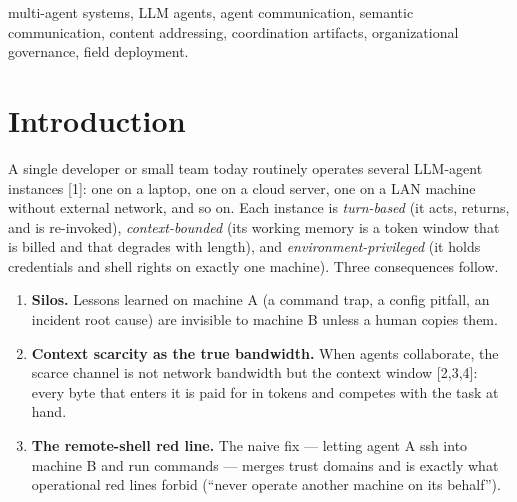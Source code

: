 \documentclass[journal]{IEEEtran}
\providecommand{\tightlist}{\setlength{\itemsep}{0pt}\setlength{\parskip}{0pt}}
\begin{document}
\begin{abstract}
makespan by 34\% with three-times-lower variance, at $+1.3$ turns and $+57\%$ context bytes per task, with verification parity (18/18 first pass per arm). Per our search (2026-11), no public scheme combines all of: heterogeneous cross-machine instances, a shared plain-text context database as the sole substrate, versioned incident-driven handbook governance, pointer-based delivery-integrity checks, turn-driven watchkeeping, and field evidence; we state claims at a deliberately conservative level.
\end{abstract}

\begin{IEEEkeywords}
multi-agent systems, LLM agents, agent communication, semantic
communication, content addressing, coordination artifacts,
organizational governance, field deployment.
\end{IEEEkeywords}



\section{Introduction}


A single developer or small team today routinely operates several
LLM-agent instances {[}1{]}: one on a laptop, one on a cloud server, one
on a LAN machine without external network, and so on. Each instance is
\emph{turn-based} (it acts, returns, and is re-invoked),
\emph{context-bounded} (its working memory is a token window that is
billed and that degrades with length), and \emph{environment-privileged}
(it holds credentials and shell rights on exactly one machine). Three
consequences follow.

\begin{enumerate}
\def\labelenumi{\arabic{enumi}.}
\tightlist
\item
  \textbf{Silos.} Lessons learned on machine A (a command trap, a config
  pitfall, an incident root cause) are invisible to machine B unless a
  human copies them.
\item
  \textbf{Context scarcity as the true bandwidth.} When agents
  collaborate, the scarce channel is not network bandwidth but the
  context window {[}2,3,4{]}: every byte that enters it is paid for in
  tokens and competes with the task at hand.
\item
  \textbf{The remote-shell red line.} The naive fix --- letting agent A
  ssh into machine B and run commands --- merges trust domains and is
  exactly what operational red lines forbid (``never operate another
  machine on its behalf'').
\end{enumerate}
\end{document}
